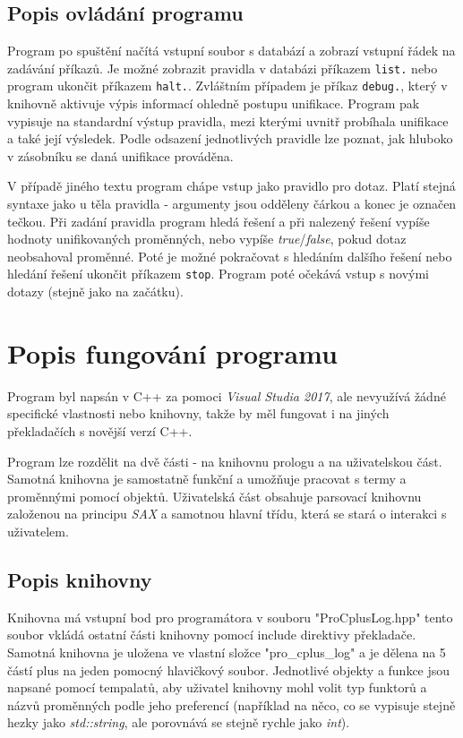 \documentclass[12pt,a4paper,titlepage]{scrartcl}
\begin{document}
	\subsection{Popis ovládání programu}
	Program po spuštění načítá vstupní soubor s databází a zobrazí vstupní řádek na zadávání příkazů. Je možné zobrazit pravidla v databázi příkazem \texttt{list.} nebo program ukončit příkazem \texttt{halt.}. Zvláštním případem je příkaz \texttt{debug.}, který v knihovně aktivuje výpis informací ohledně postupu unifikace. Program pak vypisuje na standardní výstup pravidla, mezi kterými uvnitř probíhala unifikace a také její výsledek. Podle odsazení jednotlivých pravidle lze poznat, jak hluboko v zásobníku se daná unifikace prováděna.
	\par
	V případě jiného textu program chápe vstup jako pravidlo pro dotaz. Platí stejná syntaxe jako u těla pravidla - argumenty jsou odděleny čárkou a konec je označen tečkou. Při zadání pravidla program hledá řešení a při nalezený řešení vypíše hodnoty unifikovaných proměnných, nebo vypíše \textit{true}/\textit{false}, pokud dotaz neobsahoval proměnné.
	Poté je možné pokračovat s hledáním dalšího řešení nebo hledání řešení ukončit příkazem \texttt{stop}. Program poté očekává vstup s novými dotazy (stejně jako na začátku).
	 
	\section{Popis fungování programu}
	Program byl napsán v C++ za pomoci \textit{Visual Studia 2017}, ale nevyužívá žádné specifické vlastnosti nebo knihovny, takže by měl fungovat i na jiných překladačích s novější verzí C++.
	\par
	Program lze rozdělit na dvě části - na knihovnu prologu a na uživatelskou část. Samotná knihovna je samostatně funkční a umožňuje pracovat s termy a proměnnými pomocí objektů. Uživatelská část obsahuje parsovací knihovnu založenou na principu \textit{SAX} a samotnou hlavní třídu, která se stará o interakci s uživatelem.
	
	\subsection{Popis knihovny}
	Knihovna má vstupní bod pro programátora v souboru "ProCplusLog.hpp" tento soubor vkládá ostatní části knihovny pomocí include direktivy překladače. Samotná knihovna je uložena ve vlastní složce "pro\_cplus\_log" a je dělena na 5 částí plus na jeden pomocný hlavičkový soubor. Jednotlivé objekty a funkce jsou napsané pomocí tempalatů, aby uživatel knihovny mohl volit typ funktorů a názvů proměnných podle jeho preferencí (například na něco, co se vypisuje stejně hezky jako \textit{std::string}, ale porovnává se stejně rychle jako \textit{int}).
\end{document}
